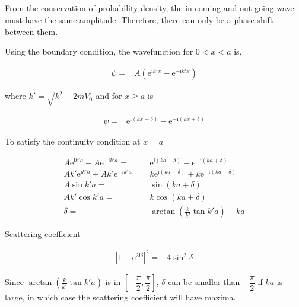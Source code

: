 \documentclass[10pt,fleqn]{article}
\newcommand{\ue}{\mathrm{e}}
\newcommand{\ui}{\mathrm{i}}
\newcommand{\eqar}[1]
{
  \begin{align*}
    #1
  \end{align*}
}
\newcommand{\paren}[1]{{\left({#1}\right)}}
\newcommand{\abs}[1]{{\left|{#1}\right|}}
\newcommand{\sqr}[1]{{\left[{#1}\right]}}
\begin{document}
\subsection{}
From the conservation of probability density,
the in-coming and out-going wave must have the same amplitude.
Therefore, there can only be a phase shift between them.

Using the boundary condition, the wavefunction for $0 < x < a$ is,
\eqar{
  \psi=&A\paren{\ue^{\ui k'x}-\ue^{-\ui k'x}}
}
where $k'=\sqrt{k^2+2mV_0}$ and for $x \geqslant a$ is
\eqar{
  \psi=&\ue^{\ui\paren{kx+\delta}}-\ue^{-\ui\paren{kx+\delta}}
}
To satisfy the continuity condition at $x=a$
\eqar{
  A\ue^{\ui k'a}-A\ue^{-\ui k'a}=&\ue^{\ui\paren{ka+\delta}}-\ue^{-\ui\paren{ka+\delta}}\\
  Ak'\ue^{\ui k'a}+Ak'\ue^{-\ui k'a}=&k\ue^{\ui\paren{ka+\delta}}+k\ue^{-\ui\paren{ka+\delta}}\\
  A\sin k'a=&\sin\paren{ka+\delta}\\
  Ak'\cos k'a=&k\cos\paren{ka+\delta}\\
  \delta=&\arctan\paren{\frac{k}{k'}\tan k'a}-ka
}
Scattering coefficient
\eqar{
  \abs{1-\ue^{2\ui\delta}}^2=&4\sin^2\delta
}
Since $\arctan\paren{\frac{k}{k'}\tan k'a}$ is in $\sqr{-\dfrac\pi2, \dfrac\pi2}$,
$\delta$ can be smaller than $-\dfrac\pi2$ if $ka$ is large, in which case the
scattering coefficient will have maxima.
\section{}
\section{}
\end{document}
